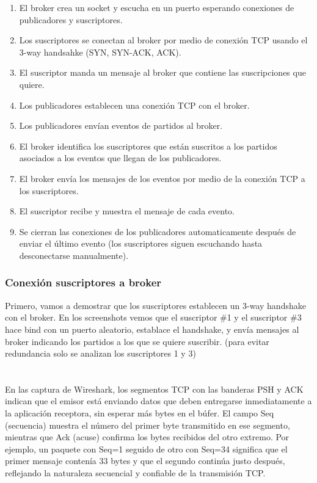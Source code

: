 \documentclass[10pt]{article}
\begin{document}
\begin{enumerate}
    \item El broker crea un socket y escucha en un puerto esperando conexiones de publicadores y suscriptores. 
    \item Los suscriptores se conectan al broker por medio de conexión TCP usando el 3-way handsahke (SYN, SYN-ACK, ACK).
    \item El suscriptor manda un mensaje al broker que contiene las suscripciones que quiere.
    \item Los publicadores establecen una conexión TCP con el broker.
    \item Los publicadores envían eventos de partidos al broker.
    \item El broker identifica los suscriptores que están suscritos a los partidos asociados a los eventos que llegan de los publicadores.
    \item El broker envía los mensajes de los eventos por medio de la conexión TCP a los suscriptores.
    \item El suscriptor recibe y muestra el mensaje de cada evento.
    \item Se cierran las conexiones de los publicadores automaticamente después de enviar el último evento  (los suscriptores siguen escuchando hasta desconectarse manualmente).
\end{enumerate}

\subsubsection{Conexión suscriptores a broker}
Primero, vamos a demostrar que los suscriptores establecen un 3-way handshake con el broker. En los screenshots vemos que el suscriptor \#1 y el suscriptor \#3 hace bind con un puerto aleatorio, establace el handshake, y envía mensajes al broker indicando los partidos a los que se quiere suscribir. (para evitar redundancia solo se analizan los suscriptores 1 y 3)
\\
\\
\\
En las captura de Wireshark, los segmentos TCP con las banderas PSH y ACK indican que el emisor está enviando datos que deben entregarse inmediatamente a la aplicación receptora, sin esperar más bytes en el búfer. El campo Seq (secuencia) muestra el número del primer byte transmitido en ese segmento, mientras que Ack (acuse) confirma los bytes recibidos del otro extremo. Por ejemplo, un paquete con Seq=1 seguido de otro con Seq=34 significa que el primer mensaje contenía 33 bytes y que el segundo continúa justo después, reflejando la naturaleza secuencial y confiable de la transmisión TCP.
\\
\end{document}
